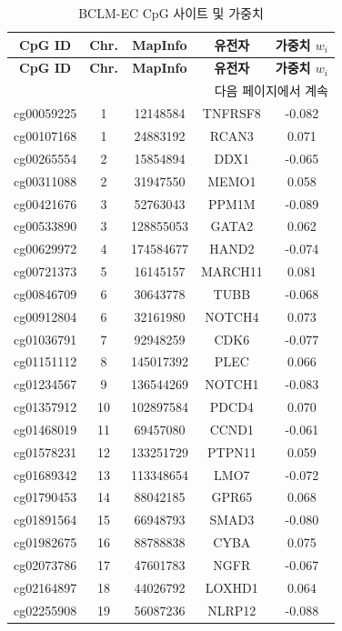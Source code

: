 \documentclass[12pt,a4paper]{article}
\begin{document}
	\begin{longtable}{|c|c|c|c|c|}
		\caption{BCLM-EC CpG 사이트 및 가중치}\label{tab:cpgs}\\
		\hline
		\textbf{CpG ID} & \textbf{Chr.} & \textbf{MapInfo} & \textbf{유전자} & \textbf{가중치 \(w_i\)} \\
		\hline
		\endfirsthead
		\hline
		\textbf{CpG ID} & \textbf{Chr.} & \textbf{MapInfo} & \textbf{유전자} & \textbf{가중치 \(w_i\)} \\
		\hline
		\endhead
		\hline
		\multicolumn{5}{r}{다음 페이지에서 계속}\\
		\endfoot
		\hline
		\endlastfoot
		cg00059225 & 1 & 12148584 & TNFRSF8 & -0.082 \\
		cg00107168 & 1 & 24883192 & RCAN3 & 0.071 \\
		cg00265554 & 2 & 15854894 & DDX1 & -0.065 \\
		cg00311088 & 2 & 31947550 & MEMO1 & 0.058 \\
		cg00421676 & 3 & 52763043 & PPM1M & -0.089 \\
		cg00533890 & 3 & 128855053 & GATA2 & 0.062 \\
		cg00629972 & 4 & 174584677 & HAND2 & -0.074 \\
		cg00721373 & 5 & 16145157 & MARCH11 & 0.081 \\
		cg00846709 & 6 & 30643778 & TUBB & -0.068 \\
		cg00912804 & 6 & 32161980 & NOTCH4 & 0.073 \\
		cg01036791 & 7 & 92948259 & CDK6 & -0.077 \\
		cg01151112 & 8 & 145017392 & PLEC & 0.066 \\
		cg01234567 & 9 & 136544269 & NOTCH1 & -0.083 \\
		cg01357912 & 10 & 102897584 & PDCD4 & 0.070 \\
		cg01468019 & 11 & 69457080 & CCND1 & -0.061 \\
		cg01578231 & 12 & 133251729 & PTPN11 & 0.059 \\
		cg01689342 & 13 & 113348654 & LMO7 & -0.072 \\
		cg01790453 & 14 & 88042185 & GPR65 & 0.068 \\
		cg01891564 & 15 & 66948793 & SMAD3 & -0.080 \\
		cg01982675 & 16 & 88788838 & CYBA & 0.075 \\
		cg02073786 & 17 & 47601783 & NGFR & -0.067 \\
		cg02164897 & 18 & 44026792 & LOXHD1 & 0.064 \\
		cg02255908 & 19 & 56087236 & NLRP12 & -0.088 \\

\end{longtable}
\end{document}
